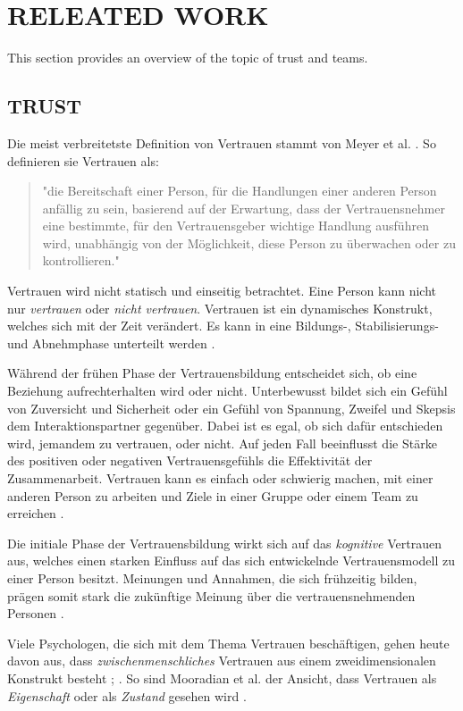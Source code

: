 \documentclass[sigchi]{acmart}
\begin{document}
\section{RELEATED WORK}
This section provides an overview of the topic of trust and teams.
\subsection{TRUST}
Die meist verbreitetste Definition von Vertrauen stammt von Meyer et al. \citep[S. 712]{mayer1995integrative}. So definieren sie Vertrauen als:
\begin{quote} "die Bereitschaft einer Person, für die Handlungen einer anderen Person anfällig zu sein, basierend auf der Erwartung, dass der Vertrauensnehmer eine bestimmte, für den Vertrauensgeber wichtige Handlung ausführen wird, unabhängig von der Möglichkeit, diese Person zu überwachen oder zu kontrollieren." \end{quote}

Vertrauen wird nicht statisch und einseitig betrachtet. Eine Person kann nicht nur \textit{vertrauen} oder \textit{nicht vertrauen}. Vertrauen ist ein dynamisches Konstrukt, welches sich mit der Zeit verändert. Es kann in eine Bildungs-, Stabilisierungs- und Abnehmphase unterteilt werden \citep[S. 396]{rousseau1998not}.

Während der frühen Phase der Vertrauensbildung entscheidet sich, ob eine Beziehung aufrechterhalten wird oder nicht. Unterbewusst bildet sich ein Gefühl von Zuversicht und Sicherheit oder ein Gefühl von Spannung, Zweifel und Skepsis dem Interaktionspartner gegenüber. 
Dabei ist es egal, ob sich dafür entschieden wird, jemandem zu vertrauen, oder nicht. Auf jeden Fall beeinflusst die Stärke des positiven oder negativen Vertrauensgefühls die Effektivität der Zusammenarbeit. Vertrauen kann es einfach oder schwierig machen, mit einer anderen Person zu arbeiten und Ziele in einer Gruppe oder einem Team zu erreichen \citep[S. 405-406]{bigley1998straining}.

Die initiale Phase der Vertrauensbildung wirkt sich auf das \textit{kognitive} Vertrauen aus, welches einen starken Einfluss auf das sich entwickelnde Vertrauensmodell zu einer Person besitzt.
Meinungen und Annahmen, die sich frühzeitig bilden, prägen somit stark die zukünftige Meinung über die vertrauensnehmenden Personen \citep[S. 461-462]{baldwin1992relational}.

Viele Psychologen, die sich mit dem Thema Vertrauen beschäftigen, gehen heute davon aus, dass \textit{zwischenmenschliches} Vertrauen aus einem zweidimensionalen Konstrukt besteht \citep{johnson2005cognitive}; \citep{cook1980new}. So sind Mooradian et al. der Ansicht, dass Vertrauen als \textit{Eigenschaft} oder als \textit{Zustand} gesehen wird \citep[S. 524-525]{mooradian2006trusts}.
\end{document}
